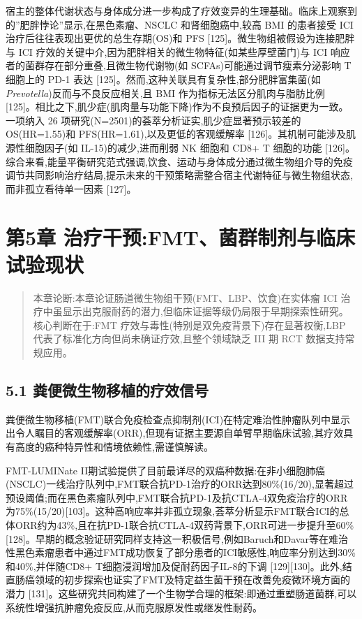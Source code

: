 宿主的整体代谢状态与身体成分进一步构成了疗效变异的生理基础。临床上观察到的''肥胖悖论''显示,在黑色素瘤、NSCLC 和肾细胞癌中,较高 BMI 的患者接受 ICI 治疗后往往表现出更优的总生存期(OS)和 PFS {[}125{]}。微生物组被假设为连接肥胖与 ICI 疗效的关键中介,因为肥胖相关的微生物特征(如某些厚壁菌门)与 ICI 响应者的菌群存在部分重叠,且微生物代谢物(如 SCFAs)可能通过调节瘦素分泌影响 T 细胞上的 PD-1 表达 {[}125{]}。然而,这种关联具有复杂性,部分肥胖富集菌(如\emph{Prevotella})反而与不良反应相关,且 BMI 作为指标无法区分肌肉与脂肪比例 {[}125{]}。相比之下,肌少症(肌肉量与功能下降)作为不良预后因子的证据更为一致。一项纳入 26 项研究(N=2501)的荟萃分析证实,肌少症显著预示较差的 OS(HR=1.55)和 PFS(HR=1.61),以及更低的客观缓解率 {[}126{]}。其机制可能涉及肌源性细胞因子(如 IL-15)的减少,进而削弱 NK 细胞和 CD8+ T 细胞的功能 {[}126{]}。综合来看,能量平衡研究范式强调,饮食、运动与身体成分通过微生物组介导的免疫调节共同影响治疗结局,提示未来的干预策略需整合宿主代谢特征与微生物组状态,而非孤立看待单一因素 {[}127{]}。

\section{第5章 治疗干预:FMT、菌群制剂与临床试验现状}\label{ux7b2c5ux7ae0-ux6cbbux7597ux5e72ux9884fmtux83ccux7fa4ux5236ux5242ux4e0eux4e34ux5e8aux8bd5ux9a8cux73b0ux72b6}

\begin{quote}
本章论断:本章论证肠道微生物组干预(FMT、LBP、饮食)在实体瘤 ICI 治疗中虽显示出克服耐药的潜力,但临床证据等级仍局限于早期探索性研究。核心判断在于:FMT 疗效与毒性(特别是双免疫背景下)存在显著权衡,LBP 代表了标准化方向但尚未确证疗效,且整个领域缺乏 III 期 RCT 数据支持常规应用。
\end{quote}

\subsection{5.1 粪便微生物移植的疗效信号}\label{ux7caaux4fbfux5faeux751fux7269ux79fbux690dux7684ux7597ux6548ux4fe1ux53f7}

粪便微生物移植(FMT)联合免疫检查点抑制剂(ICI)在特定难治性肿瘤队列中显示出令人瞩目的客观缓解率(ORR),但现有证据主要源自单臂早期临床试验,其疗效具有高度的癌种特异性和情境依赖性,需谨慎解读。

FMT-LUMINate II期试验提供了目前最详尽的双癌种数据:在非小细胞肺癌(NSCLC)一线治疗队列中,FMT联合抗PD-1治疗的ORR达到80\%(16/20),显著超过预设阈值;而在黑色素瘤队列中,FMT联合抗PD-1及抗CTLA-4双免疫治疗的ORR为75\%(15/20){[}103{]}。这种高响应率并非孤立现象,荟萃分析显示FMT联合ICI的总体ORR约为43\%,且在抗PD-1联合抗CTLA-4双药背景下,ORR可进一步提升至60\% {[}128{]}。早期的概念验证研究同样支持这一积极信号,例如Baruch和Davar等在难治性黑色素瘤患者中通过FMT成功恢复了部分患者的ICI敏感性,响应率分别达到30\%和40\%,并伴随CD8+ T细胞浸润增加及促耐药因子IL-8的下调 {[}129{]}{[}130{]}。此外,结直肠癌领域的初步探索也证实了FMT及特定益生菌干预在改善免疫微环境方面的潜力 {[}131{]}。这些研究共同构建了一个生物学合理的框架:即通过重塑肠道菌群,可以系统性增强抗肿瘤免疫反应,从而克服原发性或继发性耐药。

